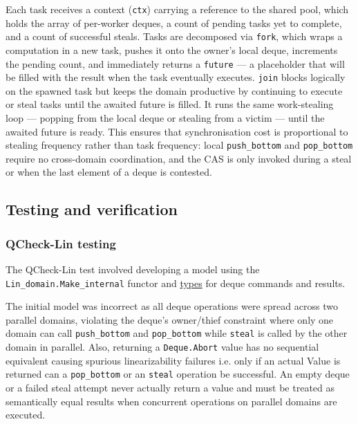 \documentclass[11pt,a4paper]{article}
\begin{document}
Each task receives a context (\texttt{ctx}) carrying a reference to the
shared pool, which holds the array of per-worker deques, a count of pending
tasks yet to complete, and a count of successful steals. Tasks are decomposed
via \texttt{fork}, which wraps a computation in a new task, pushes it onto
the owner's local deque, increments the pending count, and immediately returns
a \texttt{future} — a placeholder that will be filled with the result when the
task eventually executes.  \texttt{join} blocks logically on the spawned task
but keeps the domain productive by continuing to execute or steal tasks until
the awaited future is filled. It runs the same work-stealing loop — popping
from the local deque or stealing from a victim — until the awaited future is ready.
This ensures that synchronisation cost is proportional to stealing
frequency rather than task frequency: local \texttt{push\_bottom} and
\texttt{pop\_bottom} require no cross-domain coordination, and the
CAS is only invoked during a steal or when the last element of a deque is contested.

\subsection{Testing and verification}

\subsubsection{QCheck-Lin testing}

The QCheck-Lin test involved developing a model using the
\texttt{Lin\_domain.Make\_internal} functor and
\href{https://github.com/alinab/fork-cs6868_s26/blame/work-steal/work-steal/test/test_deque_qcheck_lin.ml}{
types} for deque commands and results.

The initial model was incorrect as all deque operations were spread across
two parallel domains, violating the deque's owner/thief constraint where only
one domain can call \texttt{push\_bottom} and \texttt{pop\_bottom}
while \texttt{steal} is called by the other domain in parallel. Also,
returning a \texttt{Deque.Abort} value has no sequential equivalent causing
spurious linearizability failures i.e. only if an
actual Value is returned can a \texttt{pop\_bottom} or an \texttt{steal}
operation be successful. An empty deque or a failed steal attempt never
actually return a value and must be treated as semantically equal results
when concurrent operations on parallel domains are executed.
\end{document}
